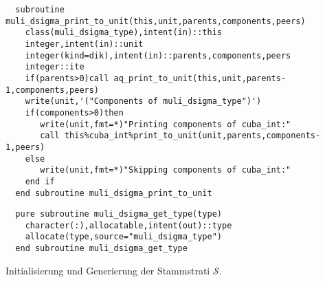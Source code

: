 \begin{Verbatim}
  subroutine muli_dsigma_print_to_unit(this,unit,parents,components,peers)
    class(muli_dsigma_type),intent(in)::this
    integer,intent(in)::unit
    integer(kind=dik),intent(in)::parents,components,peers
    integer::ite
    if(parents>0)call aq_print_to_unit(this,unit,parents-1,components,peers)
    write(unit,'("Components of muli_dsigma_type")')
    if(components>0)then
       write(unit,fmt=*)"Printing components of cuba_int:"
       call this%cuba_int%print_to_unit(unit,parents,components-1,peers)
    else
       write(unit,fmt=*)"Skipping components of cuba_int:"
    end if
  end subroutine muli_dsigma_print_to_unit
\end{Verbatim}
\begin{Verbatim}
  pure subroutine muli_dsigma_get_type(type)
    character(:),allocatable,intent(out)::type
    allocate(type,source="muli_dsigma_type")
  end subroutine muli_dsigma_get_type
\end{Verbatim}
Initialisierung und Generierung der Stammstrati $\mathcal{S}$.


